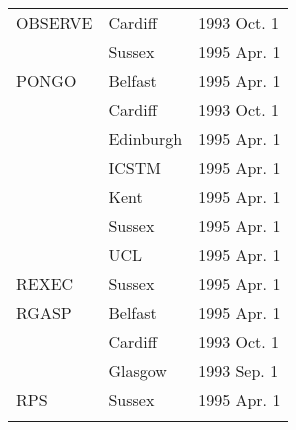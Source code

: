 \begin{table}
\begin{center}
\begin{tabular}{|p{36mm}|p{50mm}|p{30mm}|}
OBSERVE                 & Cardiff          & 1993 Oct. 1 \\
                        & Sussex           & 1995 Apr. 1 \\
PONGO                   & Belfast          & 1995 Apr. 1 \\
                        & Cardiff          & 1993 Oct. 1 \\
                        & Edinburgh        & 1995 Apr. 1 \\
                        & ICSTM            & 1995 Apr. 1 \\
                        & Kent             & 1995 Apr. 1 \\
                        & Sussex           & 1995 Apr. 1 \\
                        & UCL              & 1995 Apr. 1 \\
REXEC                   & Sussex           & 1995 Apr. 1 \\
RGASP                   & Belfast          & 1995 Apr. 1 \\
                        & Cardiff          & 1993 Oct. 1 \\
                        & Glasgow          & 1993 Sep. 1 \\
RPS                     & Sussex           & 1995 Apr. 1 \\
& & \\ \hline
\end{tabular}
\end{center}
\end{table}

